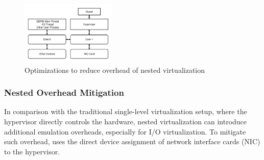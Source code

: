 
 

\begin{figure}[t!]
  \includegraphics[width=0.4\textwidth]{figures/nested_virtualization_overhead_setup.pdf}
  \caption{Optimizations to reduce overhead of nested virtualization}
  \label{fig:optimizations}
\end{figure}

\subsubsection{Nested Overhead Mitigation}
In comparison with the traditional single-level virtualization 
setup, where the hypervisor directly controls the hardware,
nested virtualization can introduce additional emulation overheads, especially for I/O virtualization. To mitigate such overhead, \arch uses the direct device assignment of network interface cards (NIC) to the hypervisor. 

